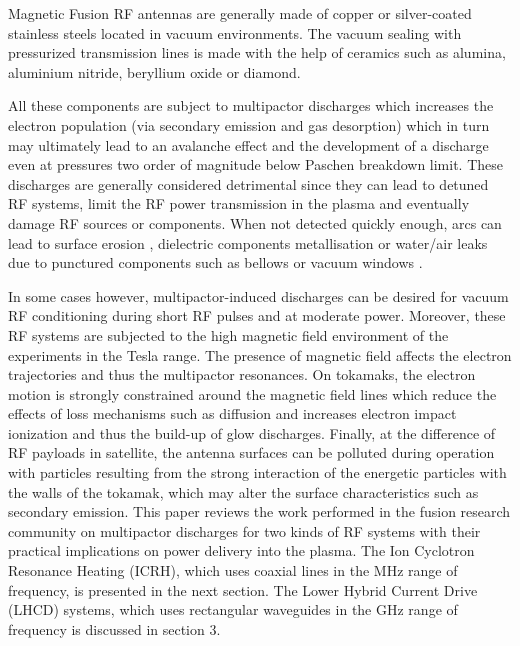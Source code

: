 Magnetic Fusion RF antennas are generally made of copper or silver-coated stainless steels located in vacuum environments. The vacuum sealing with pressurized transmission lines is made with the help of ceramics such as alumina, aluminium nitride, beryllium oxide or diamond. 

All these components are subject to multipactor discharges which increases the electron population (via secondary emission and gas desorption) which in turn may ultimately lead to an avalanche effect and the development of a discharge even at pressures two order of magnitude below Paschen breakdown limit. These discharges are generally considered detrimental since they can lead to detuned RF systems, limit the RF power transmission in the plasma and eventually damage RF sources or components. When not detected quickly enough, arcs can lead to surface erosion , dielectric components metallisation  or water/air leaks due to punctured components such as bellows  or vacuum windows . 

In some cases however, multipactor-induced discharges can be desired for vacuum RF conditioning during short RF pulses and at moderate power. Moreover, these RF systems are subjected to the high magnetic field environment of the experiments in the Tesla range. The presence of magnetic field affects the electron trajectories and thus the multipactor resonances. On tokamaks, the electron motion is strongly constrained around the magnetic field lines which reduce the effects of loss mechanisms such as diffusion and increases electron impact ionization and thus the build-up of glow discharges. Finally, at the difference of RF payloads in satellite, the antenna surfaces can be polluted during operation with particles resulting from the strong interaction of the energetic particles with the walls of the tokamak, which may alter the surface characteristics such as secondary emission. This paper reviews the work performed in the fusion research community on multipactor discharges for two kinds of RF systems with their practical implications on power delivery into the plasma. The Ion Cyclotron Resonance Heating (ICRH), which uses coaxial lines in the MHz range of frequency, is presented in the next section. The Lower Hybrid Current Drive (LHCD) systems, which uses rectangular waveguides in the GHz range of frequency is discussed in section 3. 






